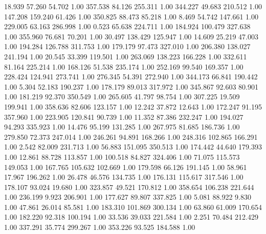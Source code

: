   18.939   57.260   54.702         1.00
 357.538   84.126  255.311         1.00
 344.227   49.683  210.512         1.00
 147.208  159.240   61.426         1.00
 350.825   88.473   85.218         1.00
   8.469   54.742  147.661         1.00
 229.005   63.163  286.998         1.00
   0.523   65.638  224.711         1.00
 184.924  100.479  327.638         1.00
 355.960   76.681   70.201         1.00
  30.497  138.429  125.947         1.00
  14.609   25.219   47.003         1.00
 194.284  126.788  311.753         1.00
 179.179   97.473  327.010         1.00
 206.380  138.027  241.194         1.00
  20.545   33.399  119.501         1.00
 263.069  138.223  166.228         1.00
 332.611   81.164  225.214         1.00
 168.126   51.538  235.174         1.00
 252.169   99.540  169.357         1.00
 228.424  124.941  273.741         1.00
 276.345   54.391  272.940         1.00
 344.173   66.841  190.442         1.00
   5.304   52.183  190.237         1.00
 178.179   89.013  317.972         1.00
 345.867   92.603   80.901         1.00
 181.219   92.370  350.549         1.00
 265.605   41.797   98.754         1.00
 307.225   19.509  199.941         1.00
 358.636   82.606  123.157         1.00
  12.242   37.872   12.643         1.00
 172.247   91.195  357.960         1.00
 223.905  120.841   90.739         1.00
  11.352   87.386  232.247         1.00
 194.027   94.293  335.923         1.00
  14.476   95.199  131.285         1.00
 267.975   81.685  186.736         1.00
 279.850   72.373  247.014         1.00
 246.261   94.891  168.266         1.00
 248.316  102.865  166.291         1.00
   2.542   82.009  231.713         1.00
  56.883  151.095  350.513         1.00
 174.442   44.640  179.393         1.00
  12.861   88.728  113.857         1.00
 100.518   84.827  324.406         1.00
  71.075  115.573  149.053         1.00
 167.765  105.632  102.669         1.00
 179.598   66.126  191.145         1.00
  58.961   17.967  196.262         1.00
  26.478   46.576  134.735         1.00
 176.131  115.617  317.546         1.00
 178.107   93.024   19.680         1.00
 323.857   49.521  170.812         1.00
 358.654  106.238  221.644         1.00
 236.199    9.923  206.901         1.00
 177.627   89.807  337.825         1.00
   5.081   88.922    9.830         1.00
  47.861   26.014   85.581         1.00
 183.310  101.869  300.134         1.00
  63.860   61.009  170.654         1.00
 182.220   92.318  100.194         1.00
  33.536   39.033  221.584         1.00
   2.251   70.484  212.429         1.00
 337.291   35.774  299.267         1.00
 353.226   93.525  184.588         1.00
